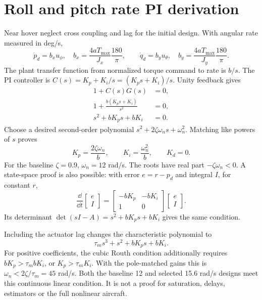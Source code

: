 \section{Roll and pitch rate PI derivation}
Near hover neglect cross coupling and lag for the initial design. With
angular rate measured in deg/s,
\begin{equation}
\dot p_d=b_xu_\phi,\quad b_x=\frac{4aT_{\max}}{J_x}\frac{180}{\pi},\qquad
\dot q_d=b_yu_\theta,\quad b_y=\frac{4aT_{\max}}{J_y}\frac{180}{\pi}.
\end{equation}
The plant transfer function from normalized torque command to rate is $b/s$.
The PI controller is $C(s)=K_p+K_i/s=(K_ps+K_i)/s$. Unity feedback gives
\begin{align}
1+C(s)G(s)&=0,\\
1+\frac{b(K_ps+K_i)}{s^2}&=0,\\
s^2+bK_ps+bK_i&=0.
\end{align}
Choose a desired second-order polynomial $s^2+2\zeta\omega_n s+\omega_n^2$.
Matching like powers of $s$ proves
\begin{equation}\boxed{K_p=\frac{2\zeta\omega_n}{b},\qquad K_i=\frac{\omega_n^2}{b},\qquad K_d=0.}\end{equation}
For the baseline $\zeta=0.9$, $\omega_n=12$ rad/s. The roots have real part
$-\zeta\omega_n<0$. A state-space proof is also possible: with error
$e=r-p_d$ and integral $I$, for constant $r$,
\begin{equation}
\frac{\dd}{\dd t}\begin{bmatrix}e\\I\end{bmatrix}
=\begin{bmatrix}-bK_p&-bK_i\\1&0\end{bmatrix}
\begin{bmatrix}e\\I\end{bmatrix}.
\end{equation}
Its determinant $\det(sI-A)=s^2+bK_ps+bK_i$ gives the same condition.

Including the actuator lag changes the characteristic polynomial to
\begin{equation}
\tau_m s^3+s^2+bK_ps+bK_i.
\end{equation}
For positive coefficients, the cubic Routh condition additionally requires
$bK_p>\tau_m bK_i$, or $K_p>\tau_mK_i$.
With the pole-matched gains this is $\omega_n<2\zeta/\tau_m=45$ rad/s.
Both the baseline 12 and selected 15.6 rad/s designs meet this continuous
linear condition. It is not a proof for saturation, delays, estimators or the
full nonlinear aircraft.

